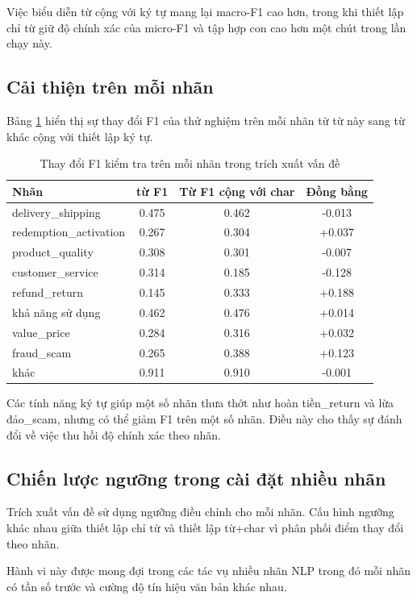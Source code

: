 \documentclass[12pt,a4paper]{article}
\begin{document}
Việc biểu diễn từ cộng với ký tự mang lại macro-F1 cao hơn, trong khi thiết lập chỉ từ giữ độ chính xác của micro-F1 và tập hợp con cao hơn một chút trong lần chạy này.

\subsection{Cải thiện trên mỗi nhãn}
Bảng \ref{tab:nlp_issue_per_label_delta} hiển thị sự thay đổi F1 của thử nghiệm trên mỗi nhãn từ từ này sang từ khác cộng với thiết lập ký tự.

\begin{table}[H]
\centering
\caption{Thay đổi F1 kiểm tra trên mỗi nhãn trong trích xuất vấn đề}
\label{tab:nlp_issue_per_label_delta}
\begin{tabular}{lccc}
\toprule
Nhãn & từ F1 & Từ F1 cộng với char & Đồng bằng \\
\midrule
delivery\_shipping & 0.475 & 0.462 & -0.013 \\
redemption\_activation & 0.267 & 0.304 & +0.037 \\
product\_quality & 0.308 & 0.301 & -0.007 \\
customer\_service & 0.314 & 0.185 & -0.128 \\
refund\_return & 0.145 & 0.333 & +0.188 \\
khả năng sử dụng & 0.462 & 0.476 & +0.014 \\
value\_price & 0.284 & 0.316 & +0.032 \\
fraud\_scam & 0.265 & 0.388 & +0.123 \\
khác & 0.911 & 0.910 & -0.001 \\
\bottomrule
\end{tabular}
\end{table}

Các tính năng ký tự giúp một số nhãn thưa thớt như hoàn tiền\_return và lừa đảo\_scam, nhưng có thể giảm F1 trên một số nhãn. Điều này cho thấy sự đánh đổi về việc thu hồi độ chính xác theo nhãn.

\subsection{Chiến lược ngưỡng trong cài đặt nhiều nhãn}
Trích xuất vấn đề sử dụng ngưỡng điều chỉnh cho mỗi nhãn. Cấu hình ngưỡng khác nhau giữa thiết lập chỉ từ và thiết lập từ+char vì phân phối điểm thay đổi theo nhãn.

Hành vi này được mong đợi trong các tác vụ nhiều nhãn NLP trong đó mỗi nhãn có tần số trước và cường độ tín hiệu văn bản khác nhau.
\end{document}
